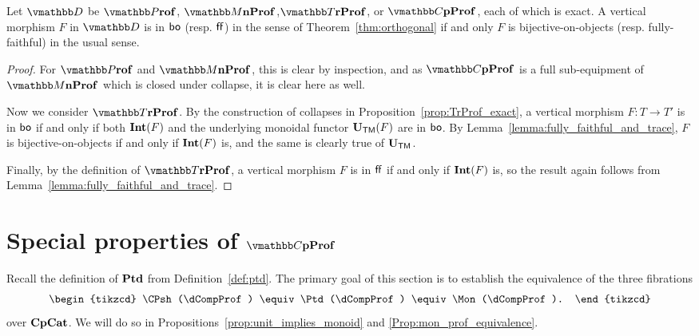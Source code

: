 \documentclass[11pt,oneside,article]{memoir}
\begin{document}
\begin{proposition}\label{prop:boff_well_named}
   Let $\dcat{D}$ be $\dProf$, $\dMonProf$,$\dTrProf$, or $\dCompProf$, each of which is exact. A vertical morphism
   $F$ in $\dcat{D}$ is in $\mathsf{bo}$ (resp. $\mathsf{ff}$) in the sense of Theorem~\ref{thm:orthogonal} if and only
   $F$ is bijective-on-objects (resp. fully-faithful) in the usual sense.
\end{proposition}
\begin{proof}
   For $\dProf$ and $\dMonProf$, this is clear by inspection, and as $\dCompProf$ is a full sub-equipment of
   $\dMonProf$ which is closed under collapse, it is clear here as well.

   Now we consider $\dTrProf$. By the construction of collapses in
   Proposition~\ref{prop:TrProf_exact}, a vertical morphism $F\colon T\to T'$ is in $\mathsf{bo}$ if and
   only if both $\mathbf{Int}(F)$ and the underlying monoidal functor $\mathbf{U}_{\mathsf{TM}}(F)$ are in $\mathsf{bo}$. By
   Lemma~\ref{lemma:fully_faithful_and_trace}, $F$ is bijective-on-objects if and only if $\mathbf{Int}(F)$
   is, and the same is clearly true of $\mathbf{U}_{\mathsf{TM}}$.

   Finally, by the definition of $\dTrProf$, a vertical morphism $F$ is in $\mathsf{ff}$ if and only if
   $\mathbf{Int}(F)$ is, so the result again follows from Lemma~\ref{lemma:fully_faithful_and_trace}.
\end{proof}



\section{Special properties of $\dCompProf$}\label{sec:special_CompProf}

Recall the definition of $\mathbf{Ptd}$ from Definition~\ref{def:ptd}. The primary goal of this section is
to establish the equivalence of the three fibrations
\begin{equation}\label{eqn:primary_goal}
   \begin{tikzcd}
      \CPsh(\dCompProf) \equiv \Ptd(\dCompProf) \equiv \Mon(\dCompProf).
   \end{tikzcd}
\end{equation}
over $\mathbf{CpCat}$. We will do so in Propositions~\ref{prop:unit_implies_monoid} and
\ref{Prop:mon_prof_equivalence}.
\end{document}
